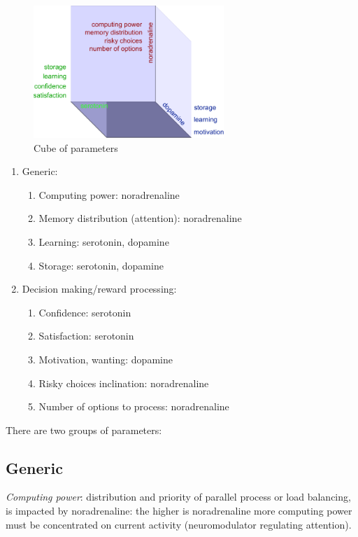 \begin{figure}
\begin{center}
 \includegraphics[height=5cm]{figure3_cube_of_parameters}
\end{center}
\caption{Cube of parameters}
\end{figure}

\begin{enumerate}
 \item  Generic:
 \begin{enumerate}
  \item  Computing power: noradrenaline
  \item  Memory distribution (attention): noradrenaline
  \item  Learning: serotonin, dopamine
  \item  Storage: serotonin, dopamine
 \end{enumerate}
 \item  Decision making/reward processing:
 \begin{enumerate}
  \item  Confidence: serotonin
  \item  Satisfaction: serotonin
  \item  Motivation, wanting: dopamine
  \item  Risky choices inclination: noradrenaline
  \item  Number of options to process: noradrenaline
 \end{enumerate}
\end{enumerate}

There are two groups of parameters:

\subsection{Generic}

\emph{Computing power}: distribution and priority of parallel process or load balancing, is impacted by noradrenaline: the higher is noradrenaline more computing power must be concentrated on current activity (neuromodulator regulating attention).


